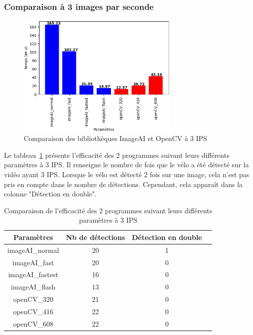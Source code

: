 \subsubsection{Comparaison à 3 images par seconde}
\label{sec:comparaisonIA:resultats:3fps}

\begin{figure}[H]
    \centering
    \includegraphics[width=0.7\textwidth]{img/result_3fps.png}
    \caption{Comparaison des bibliothèques ImageAI et OpenCV à 3 IPS}
\end{figure}

Le tableau~\ref{tab_3fps} présente l'efficacité des 2 programmes suivant leurs différents paramètres à 3 IPS.
Il renseigne le nombre de fois que le vélo a été détecté sur la vidéo ayant 3 IPS.
Lorsque le vélo est détecté 2 fois sur une image, cela n'est pas pris en compte dans le nombre de détections.
Cependant, cela apparaît dans la colonne "Détection en double".

\begin{table}[H]
    \centering
    \begin{tabular}{|c|c|c|c|}
        \hline
        \rowcolor{tableColorDark} Paramètres & Nb de détections & Détection en double \\
        \hline

        imageAI\_normal                      & 20               & 1                   \\\hline
        imageAI\_fast                        & 20               & 0                   \\\hline
        imageAI\_fastest                     & 16               & 0                   \\\hline
        imageAI\_flash                       & 13               & 0                   \\\hline
        openCV\_320                          & 21               & 0                   \\\hline
        openCV\_416                          & 22               & 0                   \\\hline
        openCV\_608                          & 22               & 0                   \\\hline
    \end{tabular}
    \caption{Comparaison de l'efficacité des 2 programmes suivant leurs différents paramètres à 3 IPS}
    \label{tab_3fps}
\end{table}

